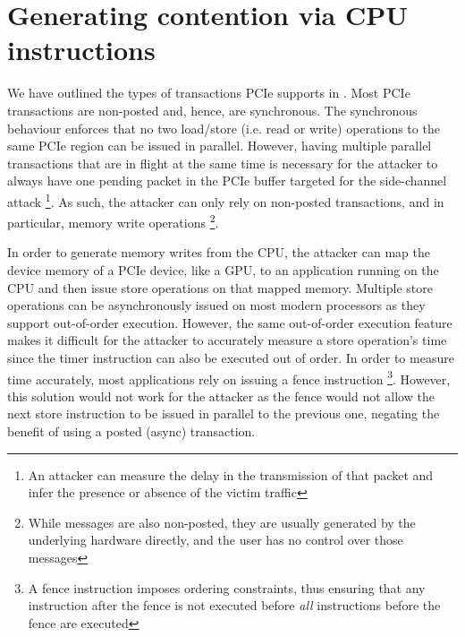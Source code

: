 \section{Generating contention via CPU instructions}
\label{sec:interconnect-sc-store-ops}

We have outlined the types of transactions PCIe supports in .
Most PCIe transactions are non-posted and, hence, are synchronous.
The synchronous behaviour enforces that no two load/store (i.e. read or write) operations to the same PCIe region can be issued in parallel.
However, having multiple parallel transactions that are in flight at the same time is necessary for the attacker to always have one pending packet in the PCIe buffer targeted for the side-channel attack
\footnote{An attacker can measure the delay in the transmission of that packet and infer the presence or absence of the victim traffic}.
As such, the attacker can only rely on non-posted transactions, and in particular, memory write operations
\footnote{While messages are also non-posted, they are usually generated by the underlying hardware directly, and the user has no control over those messages}.

In order to generate memory writes from the CPU, the attacker can map the device memory of a PCIe device, like a GPU, to an application running on the CPU and then issue store operations on that mapped memory.
Multiple store operations can be asynchronously issued on most modern processors as they support out-of-order execution. 
However, the same out-of-order execution feature makes it difficult for the attacker to accurately measure a store operation's time since the timer instruction can also be executed out of order.
In order to measure time accurately, most applications rely on issuing a fence instruction
\footnote{A fence instruction imposes ordering constraints, thus ensuring that any instruction after the fence is not executed before \textit{all} instructions before the fence are executed}.
However, this solution would not work for the attacker as the fence would not allow the next store instruction to be issued in parallel to the previous one, negating the benefit of using a posted (async) transaction.





\endinput
